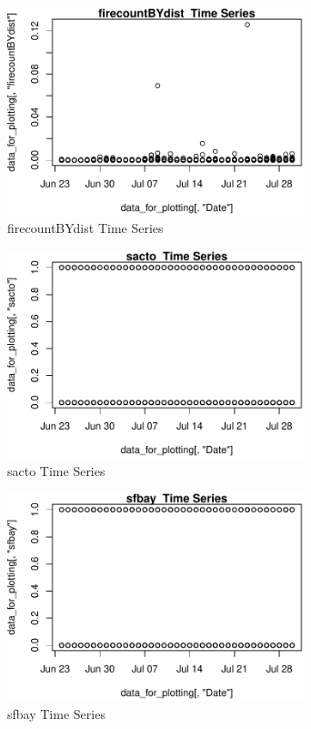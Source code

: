 \begin{figure} 
\centering  
\includegraphics[width=0.77\textwidth]{Code_Outputs/ML_input_report_AllforCaret_cleaned_StepPractice_part_practice_firecountBYdistTS.pdf} 
\caption{\label{fig:ML_input_report_AllforCaret_cleaned_StepPractice_part_practicefirecountBYdistTS}firecountBYdist  Time Series} 
\end{figure} 
 

\begin{figure} 
\centering  
\includegraphics[width=0.77\textwidth]{Code_Outputs/ML_input_report_AllforCaret_cleaned_StepPractice_part_practice_sactoTS.pdf} 
\caption{\label{fig:ML_input_report_AllforCaret_cleaned_StepPractice_part_practicesactoTS}sacto  Time Series} 
\end{figure} 
 

\begin{figure} 
\centering  
\includegraphics[width=0.77\textwidth]{Code_Outputs/ML_input_report_AllforCaret_cleaned_StepPractice_part_practice_sfbayTS.pdf} 
\caption{\label{fig:ML_input_report_AllforCaret_cleaned_StepPractice_part_practicesfbayTS}sfbay  Time Series} 
\end{figure} 
 

